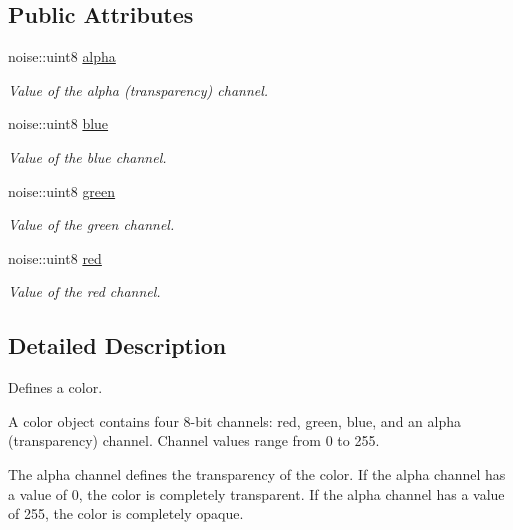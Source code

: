 \subsection*{Public Attributes}
\begin{DoxyCompactItemize}
\item 
noise\+::uint8 \hyperlink{classnoise_1_1utils_1_1_color_a2a904dbc3f6423786774bdd009fec799}{alpha}
\begin{DoxyCompactList}\small\item\em Value of the alpha (transparency) channel. \end{DoxyCompactList}\item 
noise\+::uint8 \hyperlink{classnoise_1_1utils_1_1_color_a231abbccd4c46f2ef93c25a1b904c596}{blue}
\begin{DoxyCompactList}\small\item\em Value of the blue channel. \end{DoxyCompactList}\item 
noise\+::uint8 \hyperlink{classnoise_1_1utils_1_1_color_a5c8b2568a4f0bb14283004cbab3b2d58}{green}
\begin{DoxyCompactList}\small\item\em Value of the green channel. \end{DoxyCompactList}\item 
noise\+::uint8 \hyperlink{classnoise_1_1utils_1_1_color_aab880707476cfd17cf143b80e21bbb50}{red}
\begin{DoxyCompactList}\small\item\em Value of the red channel. \end{DoxyCompactList}\end{DoxyCompactItemize}


\subsection{Detailed Description}
Defines a color.

A color object contains four 8-\/bit channels\+: red, green, blue, and an alpha (transparency) channel. Channel values range from 0 to 255.

The alpha channel defines the transparency of the color. If the alpha channel has a value of 0, the color is completely transparent. If the alpha channel has a value of 255, the color is completely opaque. 

